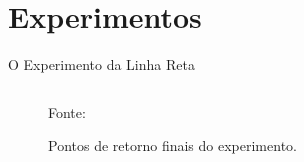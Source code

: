 \documentclass[xcolor=dvipsnames, aspectratio=169]{beamer}
\begin{document}
\section{Experimentos}
\begin{frame}{O Experimento da Linha Reta}
  \begin{columns}
    \begin{column}{0.5\textwidth}
      \begin{figure}
        \centering
        {Fonte: \cite{borenstein1995intemal}}
        \caption{Pontos de retorno finais do experimento.}
        \label{fig:3_Return_position_errors_after_completing_the_Straight_Path_Experiment}
      \end{figure}  
    \end{column}


\end{columns}
\end{frame}
\end{document}
